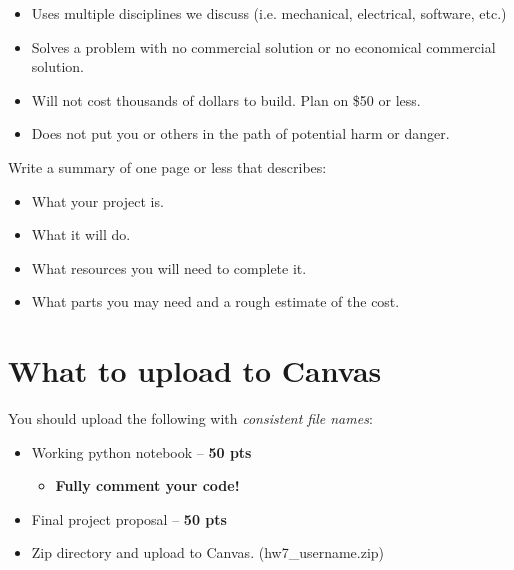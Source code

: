 \documentclass[10pt]{article}
\begin{document}
\begin{itemize}
	\item Uses multiple disciplines we discuss (i.e. mechanical, electrical, software, etc.)
	\item Solves a problem with no commercial solution or no economical commercial solution. 
	\item Will not cost thousands of dollars to build. Plan on \$50 or less.
	\item Does not put you or others in the path of potential harm or danger.
\end{itemize}

Write a summary of one page or less that describes:
\begin{itemize}
	\item What your project is.
	\item What it will do.
	\item What resources you will need to complete it.
	\item What parts you may need and a rough estimate of the cost.
\end{itemize}

\section*{What to upload to Canvas}
You should upload the following with \textit{consistent file names}:

\begin{itemize}
	\item Working python notebook -- \textbf{50 pts}
	\begin{itemize}
		\item \textbf{Fully comment your code!} 
	\end{itemize}
	\item Final project proposal -- \textbf{50 pts}
	\item Zip directory and upload to Canvas. (hw7\_username.zip)
\end{itemize}
\end{document}
